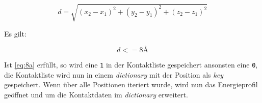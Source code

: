 \begin{equation}
    d=\sqrt{(x_2-x_1)^2+(y_2-y_1)^2+(z_2-z_1)^2}
    \label{eq:abstand}
\end{equation}

Es gilt:

\begin{equation}
    d <= 8\text{\AA}
    \label{eq:8a}
\end{equation}

Ist \ref{eq:8a} erfüllt, so wird eine \texttt{1} in der Kontaktliste gespeichert ansonsten eine \texttt{0}, die Kontaktliste wird nun in einem \emph{dictionary} mit der Position als \emph{key} gespeichert. Wenn über alle Positionen iteriert wurde, wird nun das Energieprofil geöffnet und um die Kontaktdaten im \emph{dictionary} erweitert.





